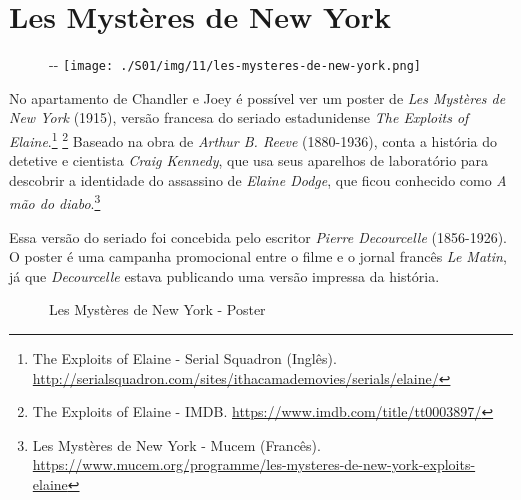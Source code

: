 \hypertarget{les-mystuxe8res-de-new-york}{%
\section{Les Mystères de New York}\label{les-mystuxe8res-de-new-york}}

\begin{figure}[!ht]
  \begin{adjustwidth}{-\oddsidemargin-1in}{-\rightmargin}
    \centering
    \texttt{[image: ./S01/img/11/les-mysteres-de-new-york.png]}
  \end{adjustwidth}
\end{figure}

No apartamento de Chandler e Joey é possível ver um poster de \emph{Les
Mystères de New York} (1915), versão francesa do seriado estadunidense
\emph{The Exploits of Elaine}.\footnote{\sloppy The Exploits of Elaine - Serial Squadron (Inglês). \url{http://serialsquadron.com/sites/ithacamademovies/serials/elaine/}}
\footnote{\sloppy The Exploits of Elaine - IMDB. \url{https://www.imdb.com/title/tt0003897/}}
Baseado na obra de \emph{Arthur B. Reeve} (1880-1936), conta a história
do detetive e cientista \emph{Craig Kennedy}, que usa seus aparelhos de
laboratório para descobrir a identidade do assassino de \emph{Elaine
Dodge}, que ficou conhecido como \emph{A mão do diabo}.\footnote{\sloppy Les Mystères de New York - Mucem (Francês). \url{https://www.mucem.org/programme/les-mysteres-de-new-york-exploits-elaine}}

\saveparinfos
\noindent
\begin{minipage}[c]{0.5\textwidth}\useparinfo

Essa versão do seriado foi concebida pelo escritor \emph{Pierre
Decourcelle} (1856-1926). O poster é uma campanha promocional entre o
filme e o jornal francês \emph{Le Matin}, já que \emph{Decourcelle}
estava publicando uma versão impressa da história.

\end{minipage}\hfill
\begin{minipage}[c]{0.5\textwidth}

\begin{figure}
  \centering
    \caption{Les Mystères de New York - Poster\label{fig:les-myst-res-de-new-york-poster}}
\end{figure}

\end{minipage}

